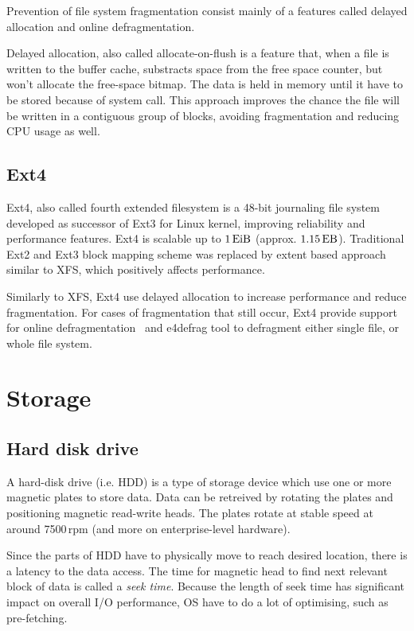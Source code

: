 \documentclass[
  color, %
  table, %
  lof,   %
  lot,   %
]{fithesis3}
\begin{document}
Prevention of file system fragmentation consist mainly of a features called delayed allocation and online defragmentation.

Delayed allocation, also called allocate-on-flush is a feature that, when a file is written to the buffer cache, substracts space from the free space counter, but won't allocate the free-space bitmap. The data is held in memory until it have to be stored because of system call. This approach improves the chance the file will be written in a contiguous group of blocks, avoiding fragmentation and reducing CPU usage as well.

\subsection{Ext4}
Ext4, also called fourth extended filesystem is a 48-bit journaling file system developed as successor of Ext3 for Linux kernel, improving reliability and performance features. Ext4 is scalable up to $\SI{1}{\exbi\byte}$ (approx. $\SI{1.15}{\exa\byte}$). Traditional Ext2 and Ext3 block mapping scheme was replaced by extent based approach similar to XFS, which positively affects performance.

Similarly to XFS, Ext4 use delayed allocation to increase performance and reduce fragmentation. For cases of fragmentation that still occur, Ext4 provide support for online defragmentation~\cite{sato2007:ext4} and e4defrag tool to defragment either single file, or whole file system.


\section{Storage}
\subsection{Hard disk drive}
A hard-disk drive (i.e. HDD) is a type of storage device which use one or more magnetic plates to store data. Data can be retreived by rotating the plates and positioning magnetic read-write heads. The plates rotate at stable speed at around 7500\,rpm (and more on enterprise-level hardware).

Since the parts of HDD have to physically move to reach desired location, there is a latency to the data access. The time for magnetic head to find next relevant block of data is called a \textit{seek time}. Because the length of seek time has significant impact on overall I/O performance, OS have to do a lot of optimising, such as pre-fetching.
\end{document}

